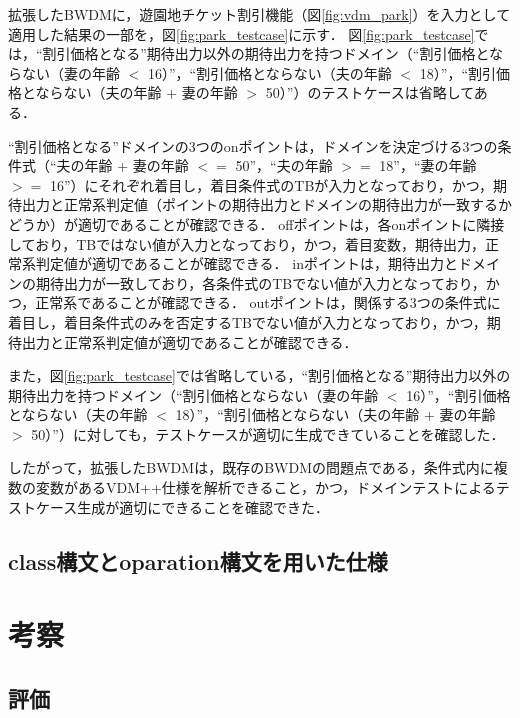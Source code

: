 \documentclass[uplatex, report, a4j, 10pt]{jsbook}
\begin{document}
拡張したBWDMに，遊園地チケット割引機能（図\ref{fig:vdm_park}）を入力として適用した結果の一部を，図\ref{fig:park_testcase}に示す．
図\ref{fig:park_testcase}では，“割引価格となる”期待出力以外の期待出力を持つドメイン（“割引価格とならない（妻の年齢 $<$ 16）”，“割引価格とならない（夫の年齢 $<$ 18）”，“割引価格とならない（夫の年齢 + 妻の年齢 $>$ 50）”）のテストケースは省略してある．

“割引価格となる”ドメインの3つのonポイントは，ドメインを決定づける3つの条件式（“夫の年齢 + 妻の年齢 $<=$ 50”，“夫の年齢 $>=$ 18”，“妻の年齢 $>=$ 16”）にそれぞれ着目し，着目条件式のTBが入力となっており，かつ，期待出力と正常系判定値（ポイントの期待出力とドメインの期待出力が一致するかどうか）が適切であることが確認できる．
offポイントは，各onポイントに隣接しており，TBではない値が入力となっており，かつ，着目変数，期待出力，正常系判定値が適切であることが確認できる．
inポイントは，期待出力とドメインの期待出力が一致しており，各条件式のTBでない値が入力となっており，かつ，正常系であることが確認できる．
outポイントは，関係する3つの条件式に着目し，着目条件式のみを否定するTBでない値が入力となっており，かつ，期待出力と正常系判定値が適切であることが確認できる．

また，図\ref{fig:park_testcase}では省略している，“割引価格となる”期待出力以外の期待出力を持つドメイン（“割引価格とならない（妻の年齢 $<$ 16）”，“割引価格とならない（夫の年齢 $<$ 18）”，“割引価格とならない（夫の年齢 + 妻の年齢 $>$ 50）”）に対しても，テストケースが適切に生成できていることを確認した．

したがって，拡張したBWDMは，既存のBWDMの問題点である，条件式内に複数の変数があるVDM++仕様を解析できること，かつ，ドメインテストによるテストケース生成が適切にできることを確認できた．


\section{class構文とoparation構文を用いた仕様}

\chapter{考察}\label{cha:Evaluation}
\section{評価}
\end{document}
